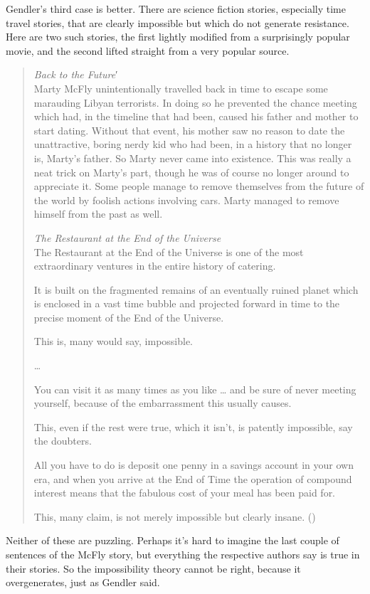 \documentclass[
  11pt,
  letterpaper,
  DIV=11,
  numbers=noendperiod,
  twoside]{scrartcl}
\begin{document}
Gendler's third case is better. There are science fiction stories,
especially time travel stories, that are clearly impossible but which do
not generate resistance. Here are two such stories, the first lightly
modified from a surprisingly popular movie, and the second lifted
straight from a very popular source.

\begin{quote}
\emph{Back to the Future}′\\
Marty McFly unintentionally travelled back in time to escape some
marauding Libyan terrorists. In doing so he prevented the chance meeting
which had, in the timeline that had been, caused his father and mother
to start dating. Without that event, his mother saw no reason to date
the unattractive, boring nerdy kid who had been, in a history that no
longer is, Marty's father. So Marty never came into existence. This was
really a neat trick on Marty's part, though he was of course no longer
around to appreciate it. Some people manage to remove themselves from
the future of the world by foolish actions involving cars. Marty managed
to remove himself from the past as well.

\emph{The Restaurant at the End of the Universe}\\
The Restaurant at the End of the Universe is one of the most
extraordinary ventures in the entire history of catering.

It is built on the fragmented remains of an eventually ruined planet
which is enclosed in a vast time bubble and projected forward in time to
the precise moment of the End of the Universe.

This is, many would say, impossible.

\ldots{}

You can visit it as many times as you like \ldots{} and be sure of never
meeting yourself, because of the embarrassment this usually causes.

This, even if the rest were true, which it isn't, is patently
impossible, say the doubters.

All you have to do is deposit one penny in a savings account in your own
era, and when you arrive at the End of Time the operation of compound
interest means that the fabulous cost of your meal has been paid for.

This, many claim, is not merely impossible but clearly insane.
()
\end{quote}

Neither of these are puzzling. Perhaps it's hard to imagine the last
couple of sentences of the McFly story, but everything the respective
authors say is true in their stories. So the impossibility theory cannot
be right, because it overgenerates, just as Gendler said.
\end{document}
